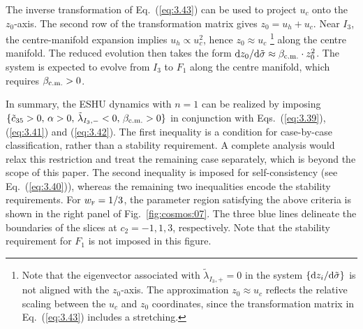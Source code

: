 \documentclass[aps,prd,twocolumn]{revtex4-2}
\newcommand\dx{{\rm d}}
\newcommand\subcm{{\rm c.m.}}
\newcommand\subF{\textsc{f}}
\begin{document}
\begin{widetext}
\begin{equation}
\end{equation}
The inverse transformation of Eq.~(\ref{eq:3.43}) can be used to project $u_c$ onto the $z_0$-axis. The second row of the transformation matrix gives $z_0=u_h+u_c$. Near $I_3$, the centre-manifold expansion implies $u_h\propto u_c^2$, hence $z_0\approx u_c$ \footnote{Note that the eigenvector associated with $\tilde{\lambda}_{I_3,+}=0$ in the system $\{\dx z_i/\dx\tilde{\sigma}\}$ is not aligned with the $z_0$-axis. The approximation $z_0\approx u_c$ reflects the relative scaling between the $u_c$ and $z_0$ coordinates, since the transformation matrix in Eq.~(\ref{eq:3.43}) includes a stretching.} along the centre manifold. The reduced evolution then takes the form $\dx z_0/\dx\tilde{\sigma}\approx\beta_\subcm\cdot z_0^2$. The system is expected to evolve from $I_3$ to $F_1$ along the centre manifold, which requires $\beta_\subcm>0$.
\end{widetext}

In summary, the ESHU dynamics with $n=1$ can be realized by imposing $\{\tilde{c}_{35}>0,\,\alpha>0,\,\tilde{\lambda}_{I_3,-}<0,\,\beta_\subcm>0\}$ in conjunction with Eqs.~(\ref{eq:3.39}), (\ref{eq:3.41}) and (\ref{eq:3.42}). The first inequality is a condition for case-by-case classification, rather than a stability requirement. A complete analysis would relax this restriction and treat the remaining case separately, which is beyond the scope of this paper. The second inequality is imposed for self-consistency (see Eq.~(\ref{eq:3.40})), whereas the remaining two inequalities encode the stability requirements. For $w_\subF=1/3$, the parameter region satisfying the above criteria is shown in the right panel of Fig.~\ref{fig:cosmos:07}. The three blue lines delineate the boundaries of the slices at $c_2=-1,1,3$, respectively. Note that the stability requirement for $F_1$ is not imposed in this figure.
\end{document}
